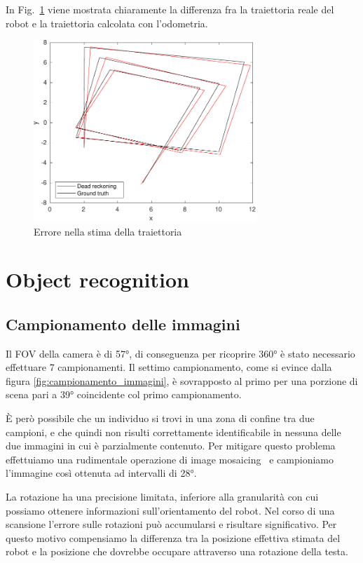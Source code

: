 \documentclass[a4paper]{article}
\begin{document}
	In Fig.~\ref{fig:trajectory_error} viene mostrata chiaramente la differenza fra la traiettoria reale del robot e la traiettoria calcolata con l'odometria.
	
	\begin{figure}[H]
		\centering
		\includegraphics[width=0.75\textwidth]{./img/trajectories.pdf}
		\caption{Errore nella stima della traiettoria}
		\label{fig:trajectory_error}
	\end{figure}
	
	
	\section{Object recognition}\label{sec:Object-recognition}
	
	\subsection{Campionamento delle immagini}\label{subsec:Campionamento-delle-immagini}
	Il FOV della camera è di 57°, di conseguenza per ricoprire 360° è stato
	necessario effettuare 7 campionamenti. Il settimo campionamento, come si
	evince dalla figura \ref{fig:campionamento_immagini}, è sovrapposto al
	primo per una porzione di scena pari a 39° coincidente col primo
	campionamento.

	È però possibile che un individuo si trovi in una zona di confine tra due
	campioni, e che quindi non risulti correttamente identificabile in nessuna
	delle due immagini in cui è parzialmente contenuto. Per mitigare questo
	problema effettuiamo una rudimentale operazione di image
	mosaicing~\cite{ghosh2016survey} e campioniamo l'immagine così ottenuta
	ad intervalli di 28°.
	
	La rotazione ha una precisione limitata, inferiore alla granularità con cui
	possiamo ottenere informazioni sull'orientamento del robot. Nel corso di
	una scansione l'errore sulle rotazioni può accumularsi e risultare
	significativo. Per questo motivo compensiamo la differenza tra la posizione
	effettiva stimata del robot e la posizione che dovrebbe occupare attraverso
	una rotazione della testa.
	
\end{document}
